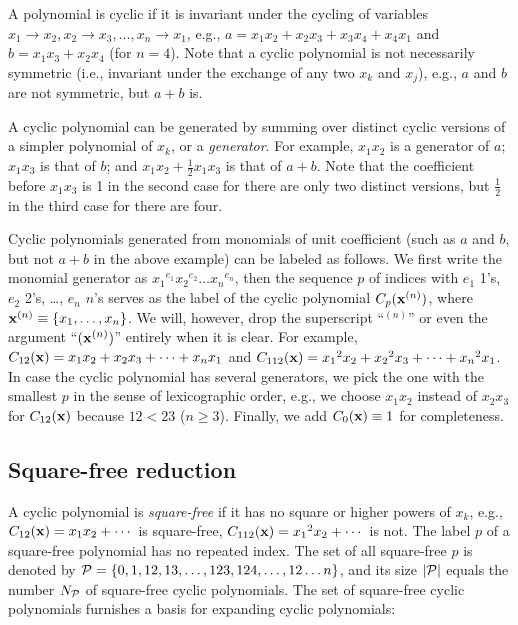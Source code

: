 \documentclass{ws-ijbc}
\begin{document}
A polynomial is cyclic if it is invariant
  under the cycling of variables
  $x_1 \rightarrow x_2, x_2 \rightarrow x_3,
  \ldots, x_n \rightarrow x_1$,
  e.g., $a = x_1 x_2 + x_2 x_3 + x_3 x_4 + x_4 x_1$
  and $b = x_1 x_3 + x_2 x_4$ (for $n = 4$).
%
Note that a cyclic polynomial is not necessarily symmetric
  (i.e., invariant under the exchange of any two $x_k$ and $x_{j}$),
  e.g., $a$ and $b$ are not symmetric,
  but $a + b$ is.


A cyclic polynomial can be generated by summing over
  distinct cyclic versions of a simpler polynomial of $x_k$, or a \emph{generator}.
For example,
$x_1 x_2$ is a generator of $a$;
$x_1 x_3$ is that of $b$;
and
$x_1 x_2 + \frac{1}{2} x_1 x_3$ is that of $a + b$.
Note that the coefficient before $x_1 x_3$
  is 1 in the second case
  for there are only two distinct versions,
  but $\frac{1}{2}$ in the third case
  for there are four. %



Cyclic polynomials
  generated from monomials of unit coefficient
  (such as $a$ and $b$, but not $a + b$ in the above example)
  can be labeled as follows.
We first write the monomial generator as
  ${x_1}^{e_1} {x_2}^{e_2} \dots {x_n}^{e_n}$,
  then the sequence $p$ of indices with
  $e_1$ 1's, $e_2$ 2's, \ldots, $e_n$ $n$'s
  serves as the label of the cyclic polynomial $C_p(\mathbf{x}^{(n)})$,
  where $\mathbf{x}^{(n)} \equiv \{x_1, \ldots, x_n\}$.
We will, however, drop the superscript ``$^{(n)}$'' or
  even the argument ``$(\mathbf{x}^{(n)})$'' entirely when it is clear.
For example,
  $C_{12}(\mathbf{x})  = x_1 x_2 + x_2 x_3 + \dots + x_n x_1$ and
  $C_{112}(\mathbf{x}) = {x_1}^2 x_2 + {x_2}^2 x_3 + \dots + {x_n}^2 x_1$.
In case the cyclic polynomial has several generators,
  we pick the one with the smallest $p$
  in the sense of lexicographic order,
  e.g., we choose $x_1 x_2$ instead of $x_2 x_3$ for $C_{12}(\mathbf{x})$
  because $12 < 23$ ($n \ge 3$).
Finally, we add $C_0(\mathbf{x}) \equiv 1$ for completeness.
%
%
%




\subsection{Square-free reduction}




A cyclic polynomial is \emph{square-free}
  if it has no square or higher powers of $x_k$,
e.g., $C_{12}(\mathbf{x}) = x_1 x_2 + \cdots$ is square-free,
  $C_{112}(\mathbf{x}) = {x_1}^2 x_2 + \cdots$ is not.
The label $p$ of a square-free polynomial
  has no repeated index.
The set of all square-free $p$ is denoted by
$\mathcal P = \{0, 1, 12, 13, \ldots, 123, 124, \ldots, 12\dots n\}$,
and its size $|\mathcal P|$ equals the number $N_\mathcal P$ of
  square-free cyclic polynomials.
%
%
The set of square-free cyclic polynomials
  furnishes a basis for expanding cyclic polynomials:
\end{document}
